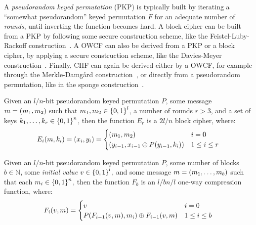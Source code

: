 A \emph{pseudorandom keyed permutation} (PKP) is typically built by iterating a 
``somewhat pseudorandom'' keyed permutation \(F\) for an adequate number of \emph{rounds}, until 
inverting the function becomes hard.
A block cipher can be built from a PKP by following some secure construction scheme, 
like the Feistel-Luby-Rackoff construction~\cite{MenezesOV2001}.
A OWCF can also be derived from a PKP or a block cipher, by applying a secure construction scheme, 
like the Davies-Meyer construction~\cite{Preneel2005}.
Finally, CHF can again be derived either by a OWCF, for example through the Merkle-Damg\r{a}rd 
construction~\cite{Merkle1979}, or directly from a pseudorandom permutation, like in the sponge 
construction~\cite{BertoniDPA2007, Tiwari2017}.
\begin{proposition}
	Given an \(l/n\)-bit pseudorandom keyed permutation \(P\), some message
  \(m = \left(m_1, m_2\right)\) such that \(m_1, m_2 \in \left\{0, 1\right\}^l\), a number of rounds 
  \(r > 3\), and a set of keys \(k_1, \dots, k_{r} \in \left\{0, 1\right\}^n\), then the function \(E_{r}\) 
	is a \(2l/n\) block cipher, where:
  \[
		 \call{E_{i}}{m, k_i} = \Tuple{x_i, y_i} = 
		\begin{cases}
			\Tuple{m_1, m_2}                                       & i = 0 \\
			\Tuple{y_{i-1}, x_{i-1} \oplus \call{P}{y_{i-1}, k_i}} & 1 \le i \le r
		\end{cases}
	\]
\end{proposition}

\begin{proposition}
	Given an \(l/n\)-bit pseudorandom keyed permutation \(P\), some number of blocks \(b \in \mathbb{N}\), 
  some \emph{initial value} \(v \in \left\{0, 1\right\}^l\), and some message 
	\(m = \left(m_1, \dots, m_b\right)\) such that each \(m_i \in \left\{0, 1\right\}^{n}\), then the function 
	\(F_{b}\) is an \(l/{bn}/l\) one-way compression function, where:
  \[
		\call{F_{i}}{v, m} =
		\begin{cases}
			v                                													& i = 0 \\
			\call{P}{\call{F_{i-1}}{v, m}, m_i} \oplus \call{F_{i-1}}{v, m} & 1 \le i \le b \\
		\end{cases}
	\]
\end{proposition}

